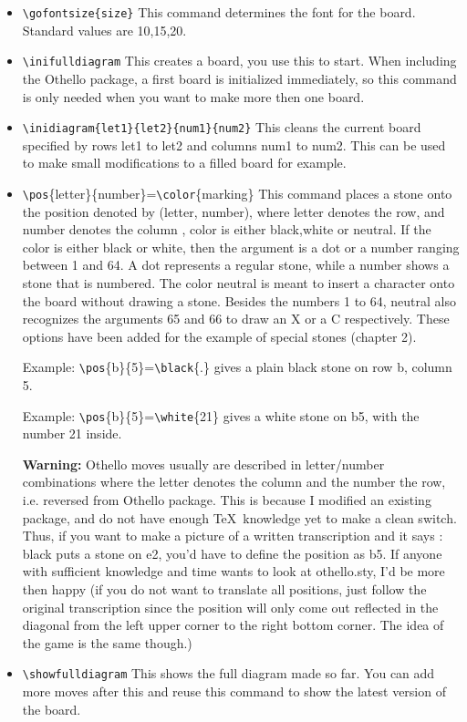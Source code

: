 \documentclass[12pt,twoside]{report}
\begin{document}
\begin{itemize}
\item {\verb|\gofontsize{size}|} This command determines the font for
the board. Standard values are 10,15,20.
\item
{\verb|\inifulldiagram|} This creates a board, you use this to
start. When including the Othello package, a first board is
initialized immediately, so this command is only needed when you
want to make more then one board.
\item
{\verb|\inidiagram{let1}{let2}{num1}{num2}|} This cleans the
current board specified by rows let1 to let2 and columns num1 to
num2. This can be used to make small modifications to a filled
board for example.

\item{\verb|\pos|}\{letter\}\{number\}={\verb|\color|}\{marking\} This command places a
stone onto the position denoted by (letter, number), where letter
denotes the row, and number denotes the column , color is either
black,white or neutral. If the color is either black or white,
then the argument is a dot or a number ranging between 1 and 64. A
dot represents a regular stone, while a number shows a stone that
is numbered. The color neutral is meant to insert a character onto
the board without drawing a stone. Besides the numbers 1 to 64,
neutral also recognizes the arguments 65 and 66 to draw an X or a
C respectively. These options have been added for the example of
special stones (chapter 2).

Example: {\verb|\pos|}\{b\}\{5\}=\hbox{\verb|\black|}\{.\}
gives a plain black stone on row b, column 5.

Example: {\verb|\pos|}\{b\}\{5\}=\hbox{\verb|\white|}\{21\} gives
a white stone on b5, with the number 21 inside.

\textbf{Warning:} Othello moves usually are described in
letter/number combinations where the letter denotes the column and
the number the row, i.e. reversed from Othello package. This is
because I modified an existing package, and do not have enough
\TeX\ knowledge yet to make a clean switch. Thus,
 if you want to make a picture of a written
transcription and it says : black puts a stone on e2, you'd have
to define the position as b5. If anyone with sufficient knowledge
and time wants to look at othello.sty, I'd be more then happy (if
you do not want to translate all positions, just follow the
original transcription since the position will only come out
reflected in the diagonal from the left upper corner to the right
bottom corner. The idea of the game is the same though.)

\item{\verb|\showfulldiagram|} This shows the full diagram made so
far. You can add more moves after this and reuse this command to
show the latest version of the board.
\end{itemize}
\end{document}
